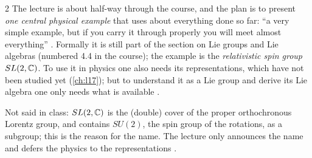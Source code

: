 \begin{paracol}{2}
The lecture is about half-way through the course, and the plan is to present \emph{one central physical example} that uses about everything done so far: ``a very simple example, but if you carry it through properly you will meet almost everything''  . Formally it is still part of the section on Lie groups and Lie algebras (numbered 4.4 in the course); the example is the \emph{relativistic spin group} $SL(2,\mathbb{C})$. To use it in physics one also needs its representations, which have not been studied yet (\cref{ch:l17}); but to understand it as a Lie group and derive its Lie algebra one only needs what is available    .
\begin{aside}
Not said in class: $SL(2,\mathbb{C})$ is the (double) cover of the proper orthochronous Lorentz group, and contains $SU(2)$, the spin group of the rotations, as a subgroup; this is the reason for the name. The lecture only announces the name and defers the physics to the representations .
\end{aside}


\end{paracol}
